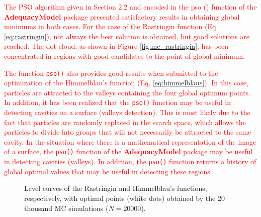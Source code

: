 \documentclass[10pt,letterpaper]{article}
\begin{document}
\textcolor{red}{The PSO algorithm given in Section 2.2 and encoded in the pso () function of the \textbf{AdequacyModel} package presented satisfactory results in obtaining global minimums in both cases. For the case of the Rastringin function (Eq. \ref{eq:rastringin}), not always the best solution is obtained, but good solutions are reached. The dot cloud, as shown in Figure \ref{fig:mc_rastringin}, has been concentrated in regions with good candidates to the point of global minimum.}

\textcolor{red}{The function \texttt{pso()} also provides good results when submitted to the optimization of the Himmelblau's function (Eq. \ref{eq:himmelblaus}). In this case, particles are attracted to the valleys containing the four global optimum points. In addition, it has been realized that the \texttt{pso()} function may be useful in detecting cavities on a surface (valleys detection). This is most likely due to the fact that particles are randomly replaced in the search space, which allows the particles to divide into groups that will not necessarily be attracted to the same cavity. In the situation where there is a mathematical representation of the image of a surface, the \texttt{pso()} function of the \textbf{AdequacyModel} package may be useful in detecting cavities (valleys). In addition, the \texttt{pso()} function returns a history of global optimal values that may be useful in detecting these regions.}


\begin{figure}[H]
	\centering
	
	\caption{Level curves of the Rastringin and Himmelblau's functions, respectively, with optimal points (white dots) obtained by the 20 thousand MC simulations ($N = 20000$).}
	
\end{figure}
\end{document}
